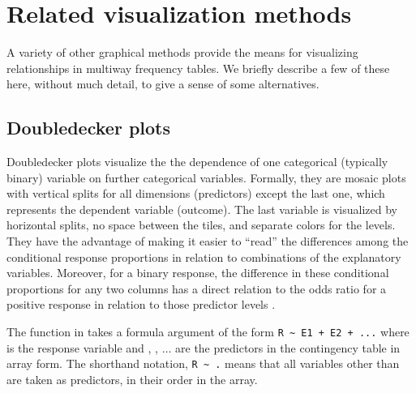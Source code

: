 \documentclass[10pt,krantz2]{krantz}\usepackage[]{graphicx}\usepackage[]{color}
\begin{document}
\section{Related visualization methods}\label{sec:related}

A variety of other graphical methods provide the means for visualizing relationships in multiway
frequency tables.  We briefly describe a few of these here, without much detail, to give a sense
of some alternatives.


\subsection{Doubledecker plots}\label{sec:doubledecker}

Doubledecker plots visualize the the dependence of one categorical (typically binary) variable on further categorical variables. Formally, they are mosaic plots with vertical splits for all dimensions (predictors) except the last one, which represents the dependent variable (outcome). The last variable is visualized by horizontal splits, no space between the tiles, and separate colors for the levels. 
They have the advantage of making it easier to ``read'' the differences among the conditional response proportions in relation to combinations of
the explanatory variables. Moreover, for a binary response, the difference in these conditional proportions for any two columns has a direct
relation to the odds ratio for a positive response in relation to those predictor levels \citep{Hofmann:2001}.

The  function in  takes a formula argument of the form \verb|R ~ E1 + E2 + ...|
where  is the response variable and , , $\dots$ are the predictors in the
contingency table in array form.  The shorthand notation, \verb|R ~ .| means that all variables other
than  are taken as predictors, in their order in the array.
\end{document}
